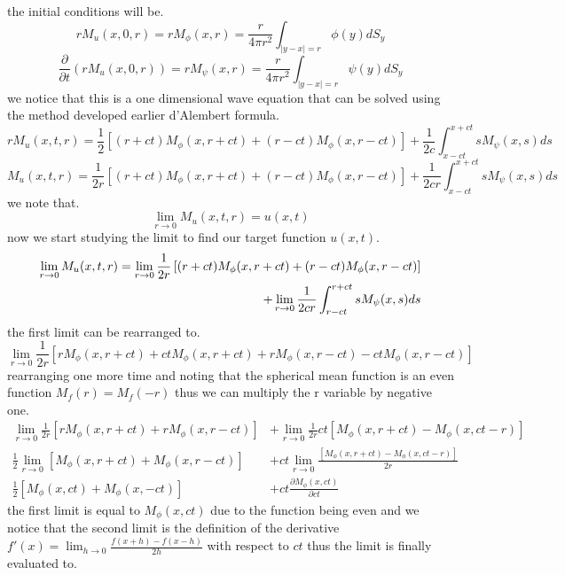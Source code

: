 \documentclass[]{article}
\begin{document}
the initial conditions will be.
\begin{equation}
rM_{u}(x,0,r) = rM_\phi(x,r) = \frac{r}{4\pi r^2} \int_{|y-x|=r}\phi(y)dS_y
\end{equation}
\begin{equation}
\frac{\partial}{\partial t}\left(rM_{u}(x,0,r)\right) = rM_\psi(x,r) = \frac{r}{4\pi r^2} \int_{|y-x|=r}\psi(y)dS_y
\end{equation}
we notice that this is a one dimensional wave equation that can be solved using the method developed earlier d'Alembert formula.
\[
    rM_u(x,t,r) = \frac{1}{2}\left[(r+ct)M_\phi(x,r+ct)+(r-ct)M_\phi(x,r-ct)\right]+\frac{1}{2c}\int_{x-ct}^{x+ct} sM_\psi(x,s)ds    
\]
\begin{equation}
M_u(x,t,r) = \frac{1}{2r}\left[(r+ct)M_\phi(x,r+ct)+(r-ct)M_\phi(x,r-ct)\right]+\frac{1}{2cr}\int_{x-ct}^{x+ct} sM_\psi(x,s)ds
\end{equation}
we note that.
\[
\lim_{r\to 0} M_u(x,t,r) = u(x,t)    
\]
now we start studying the limit to find our target function $u(x,t)$.
\begin{align}
\lim_{r\to 0} M_u(x,t,r) = \lim_{r\to 0}\frac{1}{2r}\left[(r+ct)M_\phi(x,r+ct)+(r-ct)M_\phi(x,r-ct)\right] \notag
\\
+\lim_{r\to 0}\frac{1}{2cr}\int_{r-ct}^{r+ct} sM_\psi(x,s)ds
\end{align}
the first limit can be rearranged to.
\[
    \lim_{r\to 0} \frac{1}{2r}\left[rM_\phi(x,r+ct)+ctM_\phi(x,r+ct)+rM_\phi(x,r-ct)-ctM_\phi(x,r-ct)\right]    
\]
rearranging one more time and noting that the spherical mean function is an even function $\displaystyle M_f(r)=M_f(-r)$ thus we can multiply the r variable by negative one.
\begin{align*}
    \lim_{r\to 0} \frac{1}{2r}\left[rM_\phi(x,r+ct)+rM_\phi(x,r-ct)\right] & +\lim_{r\to 0} \frac{1}{2r}ct\left[M_\phi(x,r+ct)-M_\phi(x,ct-r)\right]
    \\
    \frac{1}{2} \lim_{r\to 0} \left[M_\phi(x,r+ct)+M_\phi(x,r-ct)\right] & + ct \lim_{r\to 0} \frac{\left[M_\phi(x,r+ct)-M_\phi(x,ct-r)\right]}{2r}
    \\
    \frac{1}{2} \left[M_\phi(x,ct)+M_\phi(x,-ct)\right] & + ct \frac{\partial M_\phi(x,ct)}{\partial ct}
\end{align*}
the first limit is equal to $M_\phi(x,ct)$ due to the function being even and we notice that the second limit is the definition of the derivative$\displaystyle f'(x) = \lim_{h\to 0} \frac{f(x+h) - f(x-h)}{2h}$ with respect to $ct$ thus the limit is finally evaluated to.
\end{document}
